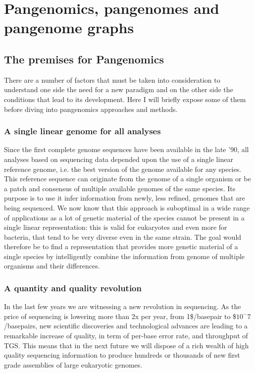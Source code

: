 \section{Pangenomics, pangenomes and pangenome graphs}
\subsection{The premises for Pangenomics}
There are a number of factors that must be taken into consideration to understand one side the need for a new paradigm and on the other side the conditions that lead to its development. Here I will briefly expose some of them before diving into pangenomics approaches and methods. 
\subsubsection{A single linear genome for all analyses}
Since the first complete genome sequences have been available in the late '90, all analyses based on sequencing data depended upon the use of a single linear reference genome, i.e. the best version of the genome available for any species. This reference sequence can originate from the genome of a single organism or be a patch and consensus of multiple available genomes of the same species. Its purpose is to use it infer information from newly, less refined, genomes that are being sequenced. We now know that this approach is suboptimal in a wide range of applications as a lot of genetic material of the species cannot be present in a single linear representation: this is valid for eukaryotes and even more for bacteria, that tend to be very diverse even in the same strain. The goal would therefore be to find a representation that provides more genetic material of a single species by intelligently combine the information from genome of multiple organisms and their differences.

\subsubsection{A quantity and quality revolution }
In the last few years we are witnessing a new revolution in sequencing. As the price of sequencing is lowering more than 2x per year, from 1\$/basepair to \$$10^-7$/basepairs\cite{durbin_recomb}, new scientific discoveries and technological advances are leading to a remarkable increase of quality, in term of per-base error rate, and throughput of TGS. This means that in the next future we will dispose of a rich wealth of high quality sequencing information to produce hundreds or thousands of new first grade assemblies of large eukaryotic genomes. 

